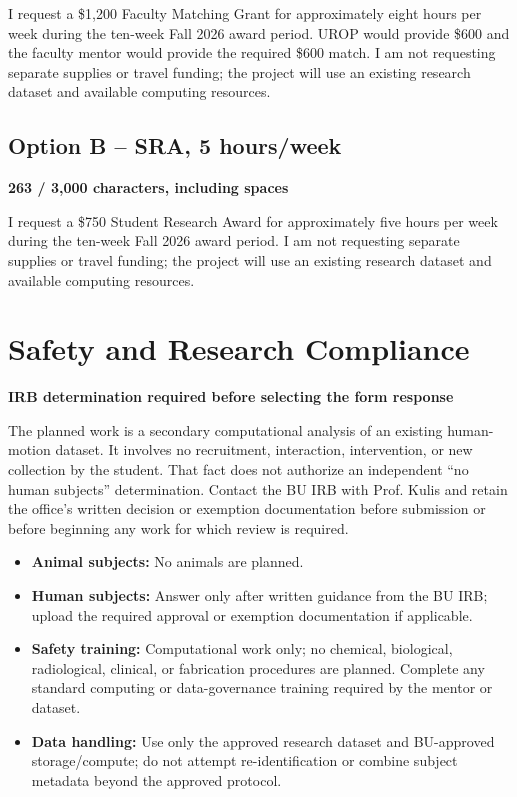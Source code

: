 \documentclass[11pt,letterpaper]{article}
\newcommand{\CharCount}[2]{%
  \begin{flushright}
    \vspace{-7pt}
    {\color{Muted}\bfseries\footnotesize #1 / #2 characters, including spaces}
  \end{flushright}
  \vspace{-3pt}
}
\begin{document}
I request a \$1,200 Faculty Matching Grant for approximately eight hours per week during the ten-week Fall 2026 award period. UROP would provide \$600 and the faculty mentor would provide the required \$600 match. I am not requesting separate supplies or travel funding; the project will use an existing research dataset and available computing resources.

\subsection*{Option B -- SRA, 5 hours/week}
\CharCount{263}{3,000}

I request a \$750 Student Research Award for approximately five hours per week during the ten-week Fall 2026 award period. I am not requesting separate supplies or travel funding; the project will use an existing research dataset and available computing resources.

\section*{Safety and Research Compliance}

\begin{warningbox}
\textbf{\color{DarkAccent}IRB determination required before selecting the form response}

The planned work is a secondary computational analysis of an existing human-motion dataset. It involves no recruitment, interaction, intervention, or new collection by the student. That fact does not authorize an independent ``no human subjects'' determination. Contact the BU IRB with Prof. Kulis and retain the office's written decision or exemption documentation before submission or before beginning any work for which review is required.
\end{warningbox}

\begin{itemize}
  \item \textbf{Animal subjects:} No animals are planned.
  \item \textbf{Human subjects:} Answer only after written guidance from the BU IRB; upload the required approval or exemption documentation if applicable.
  \item \textbf{Safety training:} Computational work only; no chemical, biological, radiological, clinical, or fabrication procedures are planned. Complete any standard computing or data-governance training required by the mentor or dataset.
  \item \textbf{Data handling:} Use only the approved research dataset and BU-approved storage/compute; do not attempt re-identification or combine subject metadata beyond the approved protocol.
\end{itemize}
\end{document}
